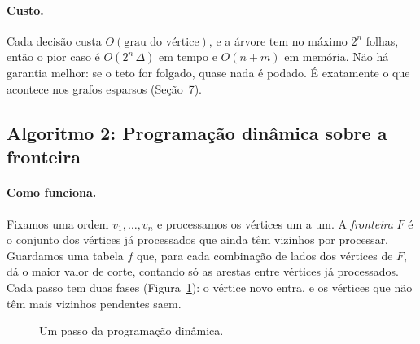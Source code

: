\paragraph{Custo.} Cada decisão custa $O(\text{grau do vértice})$, e a árvore tem no máximo $2^{n}$ folhas, então o pior caso é $O(2^{n}\,\Delta)$ em tempo e $O(n+m)$ em memória. Não há garantia melhor: se o teto for folgado, quase nada é podado. É exatamente o que acontece nos grafos esparsos (Seção~7).

\subsection{Algoritmo 2: Programação dinâmica sobre a fronteira}

\paragraph{Como funciona.} Fixamos uma ordem $v_1,\dots,v_n$ e processamos os vértices um a um. A \emph{fronteira} $F$ é o conjunto dos vértices já processados que ainda têm vizinhos por processar. Guardamos uma tabela $f$ que, para cada combinação de lados dos vértices de $F$, dá o maior valor de corte, contando só as arestas entre vértices já processados. Cada passo tem duas fases (Figura~\ref{fig:passo}): o vértice novo entra, e os vértices que não têm mais vizinhos pendentes saem.

\begin{figure}[ht]
\centering
{}
\caption{Um passo da programação dinâmica.}\label{fig:passo}
\end{figure}

